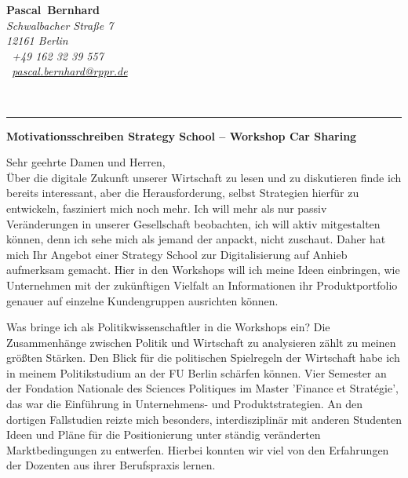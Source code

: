 \documentclass[10pt,a4paper]{article}
\def\firstname{Pascal}
\def\familyname{Bernhard}
\begin{document}
\sffamily   %
\hfill%
\begin{minipage}[t]{.6\textwidth}
	\raggedleft%
	{\bfseries {\color{firstnamecolor}\firstname}~{\color{familynamecolor}\familyname}}\\[.35ex]
	\small\itshape%
	Schwalbacher Straße 7\\
	12161 Berlin\\[.35ex]
	\Mobilefone~+49 162 32 39 557 \\
	\Letter~\href{mailto:pascal.bernhard@rppr.de}{pascal.bernhard@rppr.de}
\end{minipage}\\[0.5em]
%
{\color{firstnamecolor}\rule{\textwidth}{.25ex}}

\hfill

\begin{flushleft}
{\bfseries Motivationsschreiben Strategy School -- Workshop Car Sharing}\\[0.75em]
\end{flushleft}

Sehr geehrte Damen und Herren,\\[0.5em]
%

Über die digitale Zukunft unserer Wirtschaft zu lesen und zu diskutieren finde ich bereits interessant, aber die Herausforderung, selbst Strategien hierfür zu entwickeln, fasziniert mich noch mehr. Ich will mehr als nur passiv Veränderungen in unserer Gesellschaft beobachten, ich will aktiv mitgestalten können, denn ich sehe mich als jemand der anpackt, nicht zuschaut. Daher hat mich Ihr Angebot einer Strategy School zur Digitalisierung auf Anhieb aufmerksam gemacht. Hier in den Workshops will ich meine Ideen einbringen, wie Unternehmen mit der zukünftigen Vielfalt an Informationen ihr Produktportfolio genauer auf einzelne Kundengruppen ausrichten können.

Was bringe ich als Politikwissenschaftler in die Workshops ein? Die Zusammenhänge zwischen Politik und Wirtschaft zu analysieren zählt zu meinen größten Stärken. Den Blick für die politischen Spielregeln der Wirtschaft habe ich in meinem Politikstudium an der FU Berlin schärfen können. Vier Semester an der Fondation Nationale des Sciences Politiques im Master 'Finance et Stratégie', das war die Einführung in Unternehmens- und Produktstrategien. An den dortigen Fallstudien reizte mich besonders, interdisziplinär mit anderen Studenten Ideen und Pläne für die Positionierung unter ständig veränderten Marktbedingungen zu entwerfen. Hierbei konnten wir viel von den Erfahrungen der Dozenten aus ihrer Berufspraxis lernen.
\end{document}
